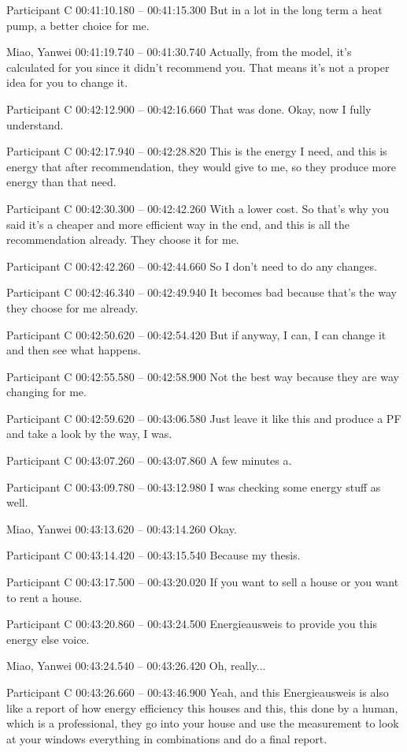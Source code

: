 {Participant C 00:41:10.180 -- 00:41:15.300
But in a lot in the long term a heat pump, a better choice for me.

Miao, Yanwei 00:41:19.740 -- 00:41:30.740
Actually, from the model, it's calculated for you since it didn't recommend you. That means it's not a proper idea for you to change it.

Participant C 00:42:12.900 -- 00:42:16.660
That was done. Okay, now I fully understand.

Participant C 00:42:17.940 -- 00:42:28.820
This is the energy I need, and this is energy that after recommendation, they would give to me, so they produce more energy than that need.

Participant C 00:42:30.300 -- 00:42:42.260
With a lower cost. So that's why you said it's a cheaper and more efficient way in the end, and this is all the recommendation already. They choose it for me.

Participant C 00:42:42.260 -- 00:42:44.660
So I don't need to do any changes.

Participant C 00:42:46.340 -- 00:42:49.940
It becomes bad because that's the way they choose for me already.

Participant C 00:42:50.620 -- 00:42:54.420
But if anyway, I can, I can change it and then see what happens.

Participant C 00:42:55.580 -- 00:42:58.900
Not the best way because they are way changing for me.

Participant C 00:42:59.620 -- 00:43:06.580
Just leave it like this and produce a PF and take a look by the way, I was.

Participant C 00:43:07.260 -- 00:43:07.860
A few minutes a.

Participant C 00:43:09.780 -- 00:43:12.980
I was checking some energy stuff as well.

Miao, Yanwei 00:43:13.620 -- 00:43:14.260
Okay.

Participant C 00:43:14.420 -- 00:43:15.540
Because my thesis.

Participant C 00:43:17.500 -- 00:43:20.020
If you want to sell a house or you want to rent a house.

Participant C 00:43:20.860 -- 00:43:24.500
Energieausweis to provide you this energy else voice.

Miao, Yanwei 00:43:24.540 -- 00:43:26.420
Oh, really...

Participant C 00:43:26.660 -- 00:43:46.900
Yeah, and this Energieausweis is also like a report of how energy efficiency this houses and this, this done by a human, which is a professional, they go into your house and use the measurement to look at your windows everything in combinations and do a final report.

}

